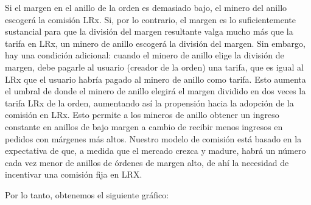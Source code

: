 \documentclass[UTF8,nofonts]{article}
\makeatletter
\newenvironment{figurehere}
 {\def\@captype{figure}}
 {}
\makeatother
\begin{document}
\begin{multicols}{2}
\begin{center}
\begin{figurehere}
\caption{Un 60\% de Margen Dividido}
\label{fig:marginsplit}
\end{figurehere}
\end{center}
Si el margen en el anillo de la orden es demasiado bajo, el minero del anillo escoger\'a la comisi\'on LRx. Si, por lo contrario, el margen es lo suficientemente sustancial para que la divisi\'on del margen resultante valga mucho m\'as que la tarifa en LRx, un minero de anillo escoger\'a la divisi\'on del margen. Sin embargo, hay una condici\'on adicional: cuando el minero de anillo elige la divisi\'on de margen, debe pagarle al usuario (creador de la orden) una tarifa, que es igual al LRx que el usuario habr\'ia pagado al minero de anillo como tarifa. Esto aumenta el umbral de donde el minero de anillo elegir\'a el margen dividido en dos veces la tarifa LRx de la orden, aumentando as\'i la propensi\'on hacia la adopci\'on de la comisi\'on en LRx.  Esto permite a los mineros de anillo obtener un ingreso constante en anillos de bajo margen a cambio de recibir menos ingresos en pedidos con m\'argenes m\'as altos. Nuestro modelo de comisi\'on est\'a basado en la expectativa de que, a medida que el mercado crezca y madure, habr\'a un n\'umero cada vez menor de anillos de \'ordenes de margen alto, de ah\'i la necesidad de incentivar una comisi\'on fija en LRX. 

Por lo tanto, obtenemos el siguiente gr\'afico:

\begin{center}
\begin{figurehere}
\centering
{}
\caption{Loopring's Fee Model}
\label{fig:feemodel}
\end{figurehere}
\end{center}


\end{multicols}
\end{document}
